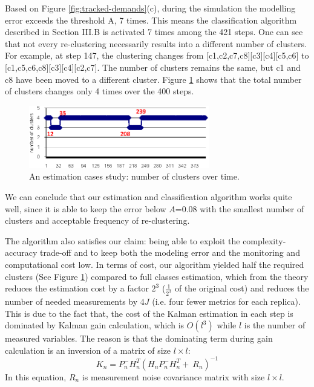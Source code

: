 Based on Figure \ref{fig:tracked-demands}(c), during the simulation the modelling error exceeds the threshold A, 7 times. This means the classification algorithm described in Section III.B is activated 7 times among the 421 steps. One can see that not every re-clustering necessarily results into a different number of clusters. For example, at step 147, the clustering changes from [c1,c2,c7,c8][c3][c4][c5,c6] to [c1,c5,c6,c8][c3][c4][c2,c7]. The number of clusters remains the same, but c1 and c8 have been moved to a different cluster. Figure \ref{fig:number-clusters-over-time} shows that the total number of clusters changes only 4 times over the 400 steps.
\begin{figure}[h]
	\centering
	\includegraphics[width=0.7\textwidth]{image/number-clusters-versus-simulation-steps.eps}
	\caption[An estimation cases study: number of clusters over time.]{An estimation cases study: number of clusters over time.}
	\label{fig:number-clusters-over-time}
\end{figure}

We can conclude that our estimation and classification algorithm works quite well, since it is able to keep the error below $A$=0.08 with the smallest number of clusters and acceptable frequency of re-clustering. 

The algorithm also satisfies our claim: being able to exploit the complexity-accuracy trade-off and to keep both the modeling error and the monitoring and computational cost low. In terms of cost, our algorithm yielded half the required clusters (See Figure \ref{fig:number-clusters-over-time}) compared to full classes estimation, which from the theory reduces the estimation cost by a factor $2^3$ ($\frac{1}{2^3}$ of the original cost) and reduces the number of needed measurements by $4J$ (i.e. four fewer metrics for each replica). This is due to the fact that, the cost of the Kalman estimation in each step is dominated by Kalman gain calculation, which is $O(l^3)$ while $l$ is the number of measured variables. The reason is that the dominating term during gain calculation is an inversion of a matrix of size $l\times l$:
\begin{equation}
	K_n=P^-_nH^T_n{(H_nP^-_nH^T_n+\ R_n)}^{-1}
\end{equation} 
In this equation, $R_n$ is measurement noise covariance matrix with size $l\times l$.

